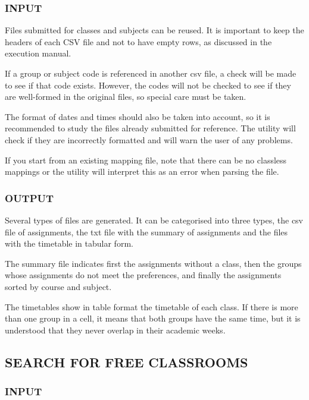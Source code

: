 \subsubsection*{INPUT}

Files submitted for classes and subjects can be reused. It is important to keep the headers of each CSV file and not to have empty rows, as discussed in the execution manual. 

If a group or subject code is referenced in another csv file, a check will be made to see if that code exists. However, the codes will not be checked to see if they are well-formed in the original files, so special care must be taken.

The format of dates and times should also be taken into account, so it is recommended to study the files already submitted for reference. The utility will check if they are incorrectly formatted and will warn the user of any problems.

If you start from an existing mapping file, note that there can be no classless mappings or the utility will interpret this as an error when parsing the file.


\subsubsection*{OUTPUT}

Several types of files are generated. It can be categorised into three types, the csv file of assignments, the txt file with the summary of assignments and the files with the timetable in tabular form.

The summary file indicates first the assignments without a class, then the groups whose assignments do not meet the preferences, and finally the assignments sorted by course and subject.

The timetables show in table format the timetable of each class. If there is more than one group in a cell, it means that both groups have the same time, but it is understood that they never overlap in their academic weeks.


\subsection*{SEARCH FOR FREE CLASSROOMS}


\subsubsection*{INPUT}


